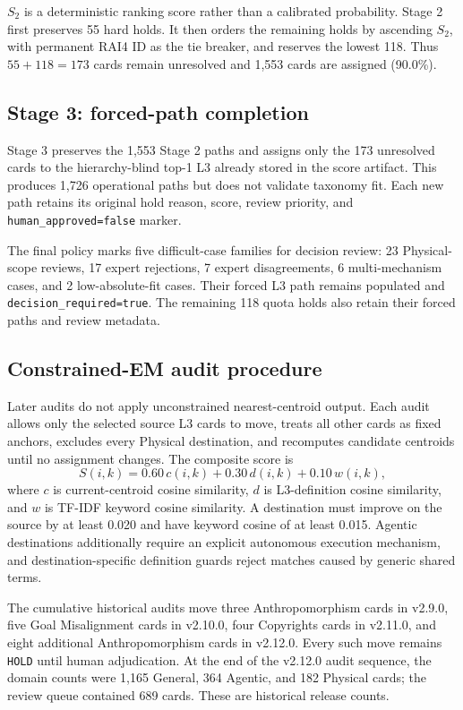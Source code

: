 \documentclass[11pt,a4paper]{article}
\newcommand{\code}[1]{\texttt{#1}}
\begin{document}
$S_2$ is a deterministic ranking score rather than a calibrated probability.
Stage 2 first preserves 55 hard holds. It then orders the remaining holds by
ascending $S_2$, with permanent RAI4 ID as the tie breaker, and reserves the
lowest 118. Thus $55+118=173$ cards remain unresolved and 1,553 cards are
assigned (90.0\%).

\subsection{Stage 3: forced-path completion}

Stage 3 preserves the 1,553 Stage 2 paths and assigns only the 173 unresolved
cards to the hierarchy-blind top-1 L3 already stored in the score artifact.
This produces 1,726 operational paths but does not validate taxonomy fit. Each
new path retains its original hold reason, score, review priority, and
\code{human\_approved=false} marker.

The final policy marks five difficult-case families for decision review:
23 Physical-scope reviews, 17 expert rejections, 7 expert disagreements,
6 multi-mechanism cases, and 2 low-absolute-fit cases. Their forced L3 path
remains populated and \code{decision\_required=true}. The
remaining 118 quota holds also retain their forced paths and review metadata.

\subsection{Constrained-EM audit procedure}
\label{sec:cem}

Later audits do not apply unconstrained nearest-centroid output. Each audit
allows only the selected source L3 cards to move, treats all other cards as
fixed anchors, excludes every Physical destination, and recomputes candidate
centroids until no assignment changes. The composite score is
\begin{equation}
S(i,k)=0.60\,c(i,k)+0.30\,d(i,k)+0.10\,w(i,k),
\end{equation}
where $c$ is current-centroid cosine similarity, $d$ is L3-definition cosine
similarity, and $w$ is TF-IDF keyword cosine similarity. A destination must
improve on the source by at least 0.020 and have keyword cosine of at least
0.015. Agentic destinations additionally require an explicit autonomous
execution mechanism, and destination-specific definition guards reject
matches caused by generic shared terms.

The cumulative historical audits move three Anthropomorphism cards in v2.9.0, five Goal
Misalignment cards in v2.10.0, four Copyrights cards in v2.11.0, and eight
additional Anthropomorphism cards in v2.12.0. Every such move remains
\code{HOLD} until human adjudication. At the end of the v2.12.0 audit sequence,
the domain counts were 1,165 General, 364 Agentic, and 182 Physical cards; the
review queue contained 689 cards. These are historical release counts.
\end{document}
